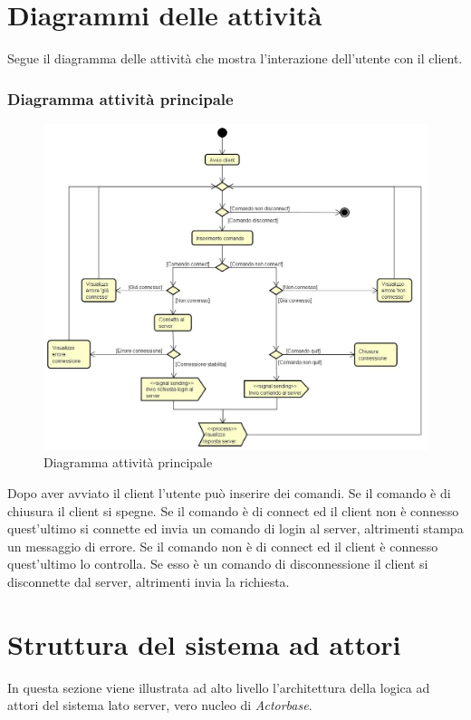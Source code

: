 \documentclass[a4paper]{article}
\begin{document}
	\newpage 
	\section{Diagrammi delle attività}
		Segue il diagramma delle attività che mostra l'interazione dell'utente con il client.
		\subsubsection{Diagramma attività principale}
		
		\begin{figure} [H]
			\centering
			\includegraphics[width=\textwidth]{ST/Attivita/attivitaPrincipale.jpg}
			\caption{Diagramma attività principale}
		\end{figure}
		Dopo aver avviato il client l'utente può inserire dei comandi. Se il comando è di chiusura il client si spegne. Se il comando è di connect ed il client non è connesso quest'ultimo si connette ed invia un comando di login al server, altrimenti stampa un messaggio di errore. Se il comando non è di connect ed il client è connesso quest'ultimo lo controlla. Se esso è un comando di disconnessione il client si disconnette dal server, altrimenti invia la richiesta.
	
		
	\newpage 
	
\section{Struttura del sistema ad attori}	
In questa sezione viene illustrata ad alto livello l'architettura della logica ad attori del sistema lato server, vero nucleo di \emph{Actorbase}.
\end{document}

